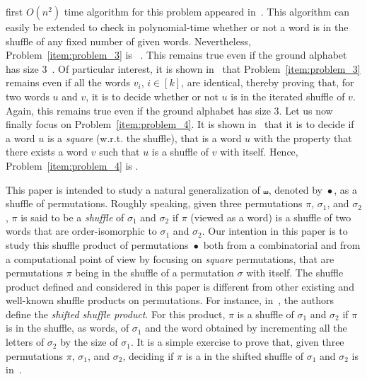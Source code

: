 \documentclass[a4paper]{llncs}
\DeclareMathOperator{\SHUFFLE}{\bullet}
\begin{document}
first $O(n^2)$ time algorithm for this problem appeared
in~\cite{Mansfield:DAM:1983}. This algorithm can easily be extended to
check in polynomial-time whether or not a word is in the shuffle of any
fixed number of given words. Nevertheless, Problem~\ref{item:problem_3}
is \NPC~\cite{Mansfield:DAM:1983,Warmuth:Haussler:JCSS:1984}. This
remains true even if the ground alphabet has size
$3$~\cite{Warmuth:Haussler:JCSS:1984}. Of particular interest,
it is shown in~\cite{Warmuth:Haussler:JCSS:1984} that
Problem~\ref{item:problem_3} remains \NPC even if all the words $v_i$,
$i \in [k]$, are identical, thereby proving that, for two words $u$ and
$v$, it is \NPC to decide whether or not $u$ is in the iterated shuffle
of $v$. Again, this remains true even if the ground alphabet has size $3$.
Let us now finally focus on Problem~\ref{item:problem_4}. It is shown
in~\cite{Buss:Soltys:2014,Rizzi:Vialette:CSR:2013} that it is \NPC to
decide if a word $u$ is a \emph{square} (w.r.t. the shuffle), that is
a word $u$ with the property that there exists a word $v$ such that $u$
is a shuffle of $v$ with itself. Hence, Problem~\ref{item:problem_4}
is \NPC.
\smallskip

This paper is intended to study a natural generalization of $\shuffle$,
denoted by $\SHUFFLE$, as a shuffle of permutations. Roughly speaking,
given three permutations $\pi$, $\sigma_1$, and $\sigma_2$, $\pi$ is
said to be a {\em shuffle} of $\sigma_1$ and $\sigma_2$ if $\pi$ (viewed
as a word) is a shuffle of two words that are order-isomorphic to
$\sigma_1$ and $\sigma_2$. Our intention in this paper is to study this
shuffle product of permutations $\SHUFFLE$ both from a combinatorial and
from a computational point of view by focusing on {\em square}
permutations, that are permutations $\pi$ being in the shuffle of a
permutation $\sigma$ with itself. The shuffle product defined and
considered in this paper is different from other existing and well-known
shuffle products on permutations. For instance, in~\cite{DHT:IJAC:2002},
the authors define the {\em shifted shuffle product}. For this product,
$\pi$ is a shuffle of $\sigma_1$ and $\sigma_2$ if $\pi$ is in the
shuffle, as words, of $\sigma_1$ and the word obtained by incrementing
all the letters of $\sigma_2$ by the size of $\sigma_1$. It is a simple
exercise to prove that, given three permutations $\pi$, $\sigma_1$, and
$\sigma_2$, deciding if $\pi$ is a in the shifted shuffle of $\sigma_1$
and $\sigma_2$ is in~\Pclass.
\smallskip
\end{document}
